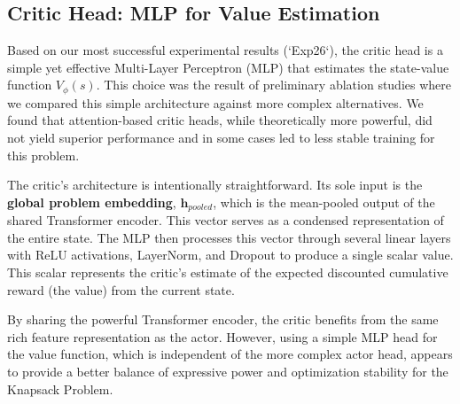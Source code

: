 \subsection{Critic Head: MLP for Value Estimation}
\label{sec:critic_head}
Based on our most successful experimental results (`Exp26`), the critic head is a simple yet effective Multi-Layer Perceptron (MLP) that estimates the state-value function \(V_\phi(s)\). This choice was the result of preliminary ablation studies where we compared this simple architecture against more complex alternatives. We found that attention-based critic heads, while theoretically more powerful, did not yield superior performance and in some cases led to less stable training for this problem.

The critic's architecture is intentionally straightforward. Its sole input is the \textbf{global problem embedding}, \(\mathbf{h}_{pooled}\), which is the mean-pooled output of the shared Transformer encoder. This vector serves as a condensed representation of the entire state. The MLP then processes this vector through several linear layers with ReLU activations, LayerNorm, and Dropout to produce a single scalar value. This scalar represents the critic's estimate of the expected discounted cumulative reward (the value) from the current state.

By sharing the powerful Transformer encoder, the critic benefits from the same rich feature representation as the actor. However, using a simple MLP head for the value function, which is independent of the more complex actor head, appears to provide a better balance of expressive power and optimization stability for the Knapsack Problem.

